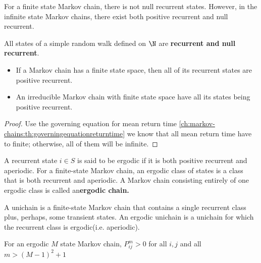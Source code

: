 \begin{refsection}
\begin{remark}
	For a finite state Markov chain, there is not null recurrent states. However, in the infinite state Markov chains, there exist both positive recurrent and null recurrent.
\end{remark}


\begin{example}
	All states of a  simple random walk defined on $\N$ are \textbf{recurrent and null recurrent}. 
\end{example}

\begin{lemma}\cite[125]{privault2013understanding}\hfill
	\begin{itemize}
		\item If a Markov chain has a finite state space, then all of its recurrent states are positive recurrent.
		\item An irreducible Markov chain with finite state space have all its states being positive recurrent.
	\end{itemize}
\end{lemma}
\begin{proof}
	Use the governing equation for mean return time \autoref{ch:markov-chains:th:governingequationreturntime} we know that all mean return time have to finite; otherwise, all of them will be infinite.
\end{proof}


\begin{definition}
	A recurrent state $i\in S$ is said to be ergodic if it is both positive recurrent and aperiodic. 
	For a finite-state Markov chain, an ergodic class of states is a class that is both recurrent and aperiodic. A Markov chain consisting entirely of one ergodic class is called an\textbf{ergodic chain.}
\end{definition}

\begin{definition}[unichain]\cite[169]{gallager2013stochastic}
	A unichain is a finite-state Markov chain that contains a single recurrent class plus, perhaps, some transient states. An ergodic unichain is a unichain for which the recurrent class is ergodic(i.e. aperiodic). 
\end{definition}


\begin{theorem}\cite[167]{gallager2013stochastic}
	For an ergodic $M$ state Markov chain, $P^m_{ij} > 0$ for all $i,j$ and all $m > (M-1)^2 + 1$
\end{theorem}




\end{refsection}
